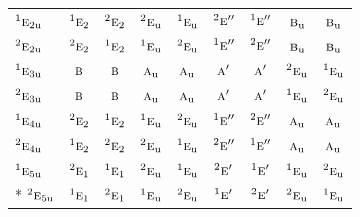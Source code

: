 \documentclass[10pt,a4paper]{article}
\numberwithin{equation}{section}
\newcommand{\irr}[1]{\text{\normalfont\scshape #1}}
\newcommand{\conjpair}[1]{{}^{#1}}
\newcommand{\ptag}[1]{\mathrm{#1}}
\begin{document}
{\begin{longtable}{@{}lcccccccc@{}}
$\conjpair{1}\irr{e}_{2\ptag{u}}$ & $\conjpair{1}\irr{e}_{2}$ & $\conjpair{2}\irr{e}_{2}$ & $\conjpair{2}\irr{e}_{\ptag{u}}$ & $\conjpair{1}\irr{e}_{\ptag{u}}$ & $\conjpair{2}\irr{e}''$ & $\conjpair{1}\irr{e}''$ & $\irr{b}_{\ptag{u}}$ & $\irr{b}_{\ptag{u}}$\\
$\conjpair{2}\irr{e}_{2\ptag{u}}$ & $\conjpair{2}\irr{e}_{2}$ & $\conjpair{1}\irr{e}_{2}$ & $\conjpair{1}\irr{e}_{\ptag{u}}$ & $\conjpair{2}\irr{e}_{\ptag{u}}$ & $\conjpair{1}\irr{e}''$ & $\conjpair{2}\irr{e}''$ & $\irr{b}_{\ptag{u}}$ & $\irr{b}_{\ptag{u}}$\\
$\conjpair{1}\irr{e}_{3\ptag{u}}$ & $\irr{b}$ & $\irr{b}$ & $\irr{a}_{\ptag{u}}$ & $\irr{a}_{\ptag{u}}$ & $\irr{a}'$ & $\irr{a}'$ & $\conjpair{2}\irr{e}_{\ptag{u}}$ & $\conjpair{1}\irr{e}_{\ptag{u}}$\\
$\conjpair{2}\irr{e}_{3\ptag{u}}$ & $\irr{b}$ & $\irr{b}$ & $\irr{a}_{\ptag{u}}$ & $\irr{a}_{\ptag{u}}$ & $\irr{a}'$ & $\irr{a}'$ & $\conjpair{1}\irr{e}_{\ptag{u}}$ & $\conjpair{2}\irr{e}_{\ptag{u}}$\\
$\conjpair{1}\irr{e}_{4\ptag{u}}$ & $\conjpair{2}\irr{e}_{2}$ & $\conjpair{1}\irr{e}_{2}$ & $\conjpair{1}\irr{e}_{\ptag{u}}$ & $\conjpair{2}\irr{e}_{\ptag{u}}$ & $\conjpair{1}\irr{e}''$ & $\conjpair{2}\irr{e}''$ & $\irr{a}_{\ptag{u}}$ & $\irr{a}_{\ptag{u}}$\\
$\conjpair{2}\irr{e}_{4\ptag{u}}$ & $\conjpair{1}\irr{e}_{2}$ & $\conjpair{2}\irr{e}_{2}$ & $\conjpair{2}\irr{e}_{\ptag{u}}$ & $\conjpair{1}\irr{e}_{\ptag{u}}$ & $\conjpair{2}\irr{e}''$ & $\conjpair{1}\irr{e}''$ & $\irr{a}_{\ptag{u}}$ & $\irr{a}_{\ptag{u}}$\\
$\conjpair{1}\irr{e}_{5\ptag{u}}$ & $\conjpair{2}\irr{e}_{1}$ & $\conjpair{1}\irr{e}_{1}$ & $\conjpair{2}\irr{e}_{\ptag{u}}$ & $\conjpair{1}\irr{e}_{\ptag{u}}$ & $\conjpair{2}\irr{e}'$ & $\conjpair{1}\irr{e}'$ & $\conjpair{1}\irr{e}_{\ptag{u}}$ & $\conjpair{2}\irr{e}_{\ptag{u}}$\\*
$\conjpair{2}\irr{e}_{5\ptag{u}}$ & $\conjpair{1}\irr{e}_{1}$ & $\conjpair{2}\irr{e}_{1}$ & $\conjpair{1}\irr{e}_{\ptag{u}}$ & $\conjpair{2}\irr{e}_{\ptag{u}}$ & $\conjpair{1}\irr{e}'$ & $\conjpair{2}\irr{e}'$ & $\conjpair{2}\irr{e}_{\ptag{u}}$ & $\conjpair{1}\irr{e}_{\ptag{u}}$\\
\bottomrule\end{longtable}}
\end{document}
